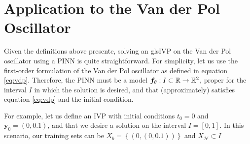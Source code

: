 \section{Application to the Van der Pol Oscillator}

Given the definitions above presente, solving an gls{IVP} on the Van der Pol oscillator using a \gls{PINN} is quite straightforward.
For simplicity, let us use the first-order formulation of the Van der Pol oscillator as defined in equation \eqref{eq:vdp}.
Therefore, the \gls{PINN} must be a model $\bm{f}_\theta:I\subset \mathbb{R}\to \mathbb{R}^2$, proper for the interval $I$ in which the solution is desired, and that (approximately) satisfies equation \eqref{eq:vdp} and the initial condition.

For example, let us define an \gls{IVP} with initial conditions $t_0=0$ and $\bm{y}_0=\left( 0,0.1 \right) $, and that we desire a solution on the interval $I=\left[ 0,1 \right] $.
In this scenario, our training sets can be $X_b=\left\{ \left( 0,\left( 0,0.1 \right)  \right)  \right\} $ and $X_{\mathcal{N}}\subset I$

